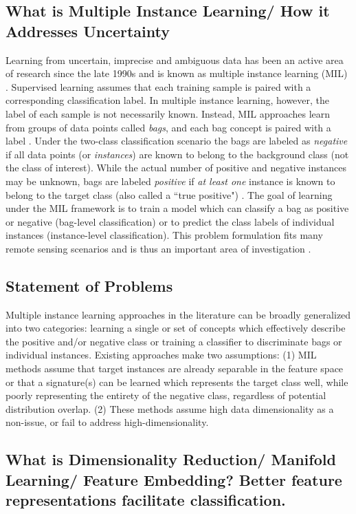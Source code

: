 \subsection{What is Multiple Instance Learning/ How it Addresses Uncertainty}
Learning from uncertain, imprecise and ambiguous data has been an active area of research since the late 1990s and is known as multiple instance learning (MIL) \cite{Bocinsky2019Thesis}.  Supervised learning assumes that each training sample is paired with a corresponding classification label.  In multiple instance learning, however, the label of each sample is not necessarily known.  Instead, MIL approaches learn from groups of data points called \textit{bags}, and each bag concept is paired with a label \cite{Cook2015Thesis}. Under the two-class classification scenario the bags are labeled as \textit{negative} if all data points (or \textit{instances}) are known to belong to the background class (not the class of interest).  While the actual number of positive and negative instances may be unknown, bags are labeled \textit{positive} if \textit{at least one} instance is known to belong to the target class (also called a ``true positive") \cite{Zare2016MIACE}.  The goal of learning under the MIL framework is to train a model which can classify a bag as positive or negative (bag-level classification) or to predict the class labels of individual instances (instance-level classification). This problem formulation fits many remote sensing scenarios and is thus an important area of investigation \cite{Du2017Thesis}.  

\subsection{Statement of Problems}
Multiple instance learning approaches in the literature can be broadly generalized into two categories: learning a single or set of concepts which effectively describe the positive and/or negative class or training a classifier to discriminate bags or individual instances.  Existing approaches make two assumptions:  (1) MIL methods assume that target instances are already separable in the feature space or that a signature(s) can be learned which represents the target class well, while poorly representing the entirety of the negative class, regardless of potential distribution overlap. (2) These methods assume high data dimensionality as a non-issue, or fail to address high-dimensionality.

\subsection{What is Dimensionality Reduction/ Manifold Learning/ Feature Embedding?  Better feature representations facilitate classification.}


